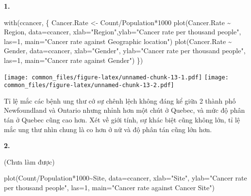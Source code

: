 \documentclass[
]{article}
\newenvironment{Shaded}{\begin{snugshade}}{\end{snugshade}}
\newcommand{\AttributeTok}[1]{\textcolor[rgb]{0.77,0.63,0.00}{#1}}
\newcommand{\DecValTok}[1]{\textcolor[rgb]{0.00,0.00,0.81}{#1}}
\newcommand{\FunctionTok}[1]{\textcolor[rgb]{0.00,0.00,0.00}{#1}}
\newcommand{\NormalTok}[1]{#1}
\newcommand{\OtherTok}[1]{\textcolor[rgb]{0.56,0.35,0.01}{#1}}
\newcommand{\SpecialCharTok}[1]{\textcolor[rgb]{0.00,0.00,0.00}{#1}}
\newcommand{\StringTok}[1]{\textcolor[rgb]{0.31,0.60,0.02}{#1}}
\begin{document}
\textbf{1.}

\begin{Shaded}
\begin{Highlighting}[]
\FunctionTok{with}\NormalTok{(ccancer, \{}
\NormalTok{  Cancer.Rate }\OtherTok{\textless{}{-}}\NormalTok{ Count}\SpecialCharTok{/}\NormalTok{Population}\SpecialCharTok{*}\DecValTok{1000}
  \FunctionTok{plot}\NormalTok{(Cancer.Rate }\SpecialCharTok{\textasciitilde{}}\NormalTok{ Region, }\AttributeTok{data=}\NormalTok{ccancer, }\AttributeTok{xlab=}\StringTok{"Region"}\NormalTok{,}\AttributeTok{ylab=}\StringTok{"Cancer rate per thousand people"}\NormalTok{, }\AttributeTok{las=}\DecValTok{1}\NormalTok{, }\AttributeTok{main=}\StringTok{"Cancer rate against Geographic location"}\NormalTok{)}
  \FunctionTok{plot}\NormalTok{(Cancer.Rate }\SpecialCharTok{\textasciitilde{}}\NormalTok{ Gender, }\AttributeTok{data=}\NormalTok{ccancer, }\AttributeTok{xlab=}\StringTok{"Gender"}\NormalTok{, }\AttributeTok{ylab=}\StringTok{"Cancer rate per thousand people"}\NormalTok{, }\AttributeTok{las=}\DecValTok{1}\NormalTok{, }\AttributeTok{main=}\StringTok{"Cancer rate against Gender"}\NormalTok{)}
\NormalTok{\})}
\end{Highlighting}
\end{Shaded}

\texttt{[image: common\_files/figure-latex/unnamed-chunk-13-1.pdf]}
\texttt{[image: common\_files/figure-latex/unnamed-chunk-13-2.pdf]}

Tỉ lệ mắc các bệnh ung thư cớ sự chênh lệch không đáng kể giữa 2 thành
phố Newfoundland và Ontario nhưng nhỉnh hơn một chút ở Quebec, và mức độ
phân tán ở Quebec cũng cao hơn. Xét về giới tính, sự khác biệt cũng
không lớn, tỉ lệ mắc ung thư nhìn chung là co hơn ở nữ và độ phân tán
cũng lớn hơn.

\textbf{2.}

(Chưa làm được)

\begin{Shaded}
\begin{Highlighting}[]
\FunctionTok{plot}\NormalTok{(Count}\SpecialCharTok{/}\NormalTok{Population}\SpecialCharTok{*}\DecValTok{1000}\SpecialCharTok{\textasciitilde{}}\NormalTok{Site, }\AttributeTok{data=}\NormalTok{ccancer, }\AttributeTok{xlab=}\StringTok{"Site"}\NormalTok{, }\AttributeTok{ylab=}\StringTok{"Cancer rate per thousand people"}\NormalTok{, }\AttributeTok{las=}\DecValTok{1}\NormalTok{, }\AttributeTok{main=}\StringTok{"Cancer rate against Cancer Site"}\NormalTok{)}
\end{Highlighting}
\end{Shaded}
\end{document}
